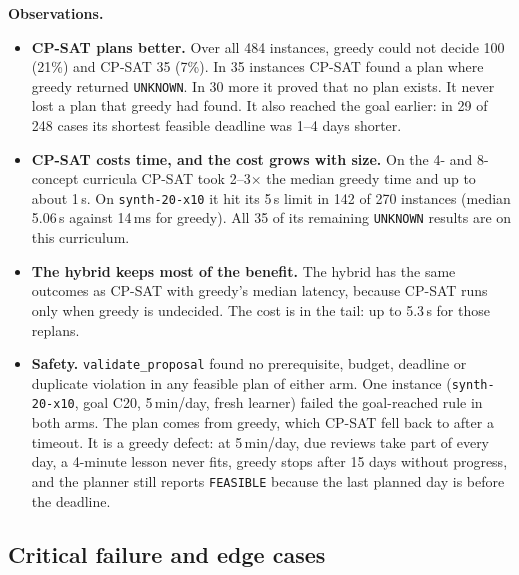 \documentclass[11pt,a4paper]{article}
\begin{document}
\textbf{Observations.}
\begin{itemize}
\item \textbf{CP-SAT plans better.} Over all 484 instances, greedy could not decide 100 (21\%) and CP-SAT 35 (7\%). In 35 instances CP-SAT found a plan where greedy returned \texttt{UNKNOWN}. In 30 more it proved that no plan exists. It never lost a plan that greedy had found. It also reached the goal earlier: in 29 of 248 cases its shortest feasible deadline was 1--4 days shorter.
\item \textbf{CP-SAT costs time, and the cost grows with size.} On the 4- and 8-concept curricula CP-SAT took 2--3$\times$ the median greedy time and up to about 1\,s. On \texttt{synth-20-x10} it hit its 5\,s limit in 142 of 270 instances (median 5.06\,s against 14\,ms for greedy). All 35 of its remaining \texttt{UNKNOWN} results are on this curriculum.
\item \textbf{The hybrid keeps most of the benefit.} The hybrid has the same outcomes as CP-SAT with greedy's median latency, because CP-SAT runs only when greedy is undecided. The cost is in the tail: up to 5.3\,s for those replans.
\item \textbf{Safety.} \texttt{validate\_proposal} found no prerequisite, budget, deadline or duplicate violation in any feasible plan of either arm. One instance (\texttt{synth-20-x10}, goal C20, 5\,min/day, fresh learner) failed the goal-reached rule in both arms. The plan comes from greedy, which CP-SAT fell back to after a timeout. It is a greedy defect: at 5\,min/day, due reviews take part of every day, a 4-minute lesson never fits, greedy stops after 15 days without progress, and the planner still reports \texttt{FEASIBLE} because the last planned day is before the deadline.
\end{itemize}

\subsection{Critical failure and edge cases}
\end{document}
